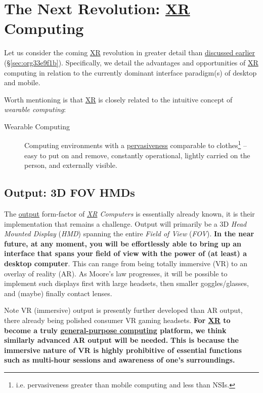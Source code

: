 \documentclass[logo,bsc,singlespacing,parskip]{infthesis}
\begin{document}
\chapter{The Next Revolution: \hyperref[org39cbd51]{XR} Computing}
\label{sec:orgb165994}
Let us consider the coming \hyperref[org39cbd51]{XR} revolution in greater detail than \hyperref[sec:org33e9f1b]{discussed earlier} (\S \ref{sec:org33e9f1b}).
Specifically, we detail the advantages and opportunities of \hyperref[org39cbd51]{XR} computing in relation to the currently dominant interface paradigm(s) of desktop and mobile.

Worth mentioning is that \hyperref[org39cbd51]{XR} is closely related to the intuitive concept of \emph{wearable computing}:

\begin{mdframed}
\begin{description}
\item[{Wearable Computing\label{wearable computing}}] Computing environments with a \hyperref[pervasiveness]{pervasiveness} comparable to clothes\footnote{i.e. pervasiveness greater than mobile computing and less than NSIs.} -- easy to put on and remove, constantly operational, lightly carried on the person, and externally visible.
\end{description}
\end{mdframed}
\section{Output: 3D FOV HMDs}
\label{sec:orgb88004b}
The \hyperref[output]{output} form-factor of \emph{\hyperref[org39cbd51]{XR} Computers} is essentially already known, it is their implementation that remains a challenge.
Output will primarily be a 3D \emph{Head Mounted Display} (\emph{HMD}) spanning the entire \emph{Field of View} (\emph{FOV}).
\textbf{In the near future, at any moment, you will be effortlessly able to bring up an interface that spans your field of view with the power of (at least) a desktop computer}.
This can range from being totally immersive (VR) to an overlay of reality (AR).
As Moore's law progresses, it will be possible to implement such displays first with large headsets, then smaller goggles/glasses, and (maybe) finally contact lenses.

Note VR (immersive) output is presently further developed than AR output, there already being polished consumer VR gaming headsets.
\textbf{For \hyperref[org39cbd51]{XR} to become a truly \hyperref[orgbaec896]{general-purpose computing} platform, we think similarly advanced AR output will be needed.}
\textbf{This is because the immersive nature of VR is highly prohibitive of essential functions such as multi-hour sessions and awareness of one's surroundings.}
\end{document}
